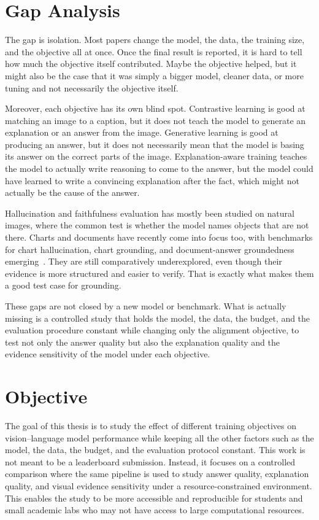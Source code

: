 \section{Gap Analysis}
The gap is isolation.
Most papers change the model, the data, the training size, and the objective all at once.
Once the final result is reported, it is hard to tell how much the objective itself contributed.
Maybe the objective helped, but it might also be the case that it was simply a bigger model, cleaner data, or more tuning and not necessarily the objective itself.

Moreover, each objective has its own blind spot.
Contrastive learning is good at matching an image to a caption, but it does not teach the model to generate an explanation or an answer from the image.
Generative learning is good at producing an answer, but it does not necessarily mean that the model is basing its answer on the correct parts of the image.
Explanation-aware training teaches the model to actually write reasoning to come to the answer, but the model could have learned to write a convincing explanation after the fact,
which might not actually be the cause of the answer.

Hallucination and faithfulness evaluation has mostly been studied on natural images, where the common test is whether the model names objects that are not there.
Charts and documents have recently come into focus too, with benchmarks for chart hallucination, chart grounding, and document-answer groundedness emerging~\cite{wang2025charthal,bansal2025chartab,chen2025docqa}.
They are still comparatively underexplored, even though their evidence is more structured and easier to verify.
That is exactly what makes them a good test case for grounding.

These gaps are not closed by a new model or benchmark. What is actually missing is a controlled study that holds the model, the data, the budget, 
and the evaluation procedure constant while changing only the alignment objective, to test not only the answer quality but also the explanation quality and the evidence sensitivity of the model under each objective.

\section{Objective}
The goal of this thesis is to study the effect of different training objectives on vision--language model performance
while keeping all the other factors such as the model, the data, the budget, and the evaluation protocol constant.
This work is not meant to be a leaderboard submission.
Instead, it focuses on a controlled comparison where the same pipeline is used to 
study answer quality, explanation quality, and visual evidence sensitivity under a resource-constrained environment.
This enables the study to be more accessible and reproducible for students and small academic labs who may not have access to large computational resources.

